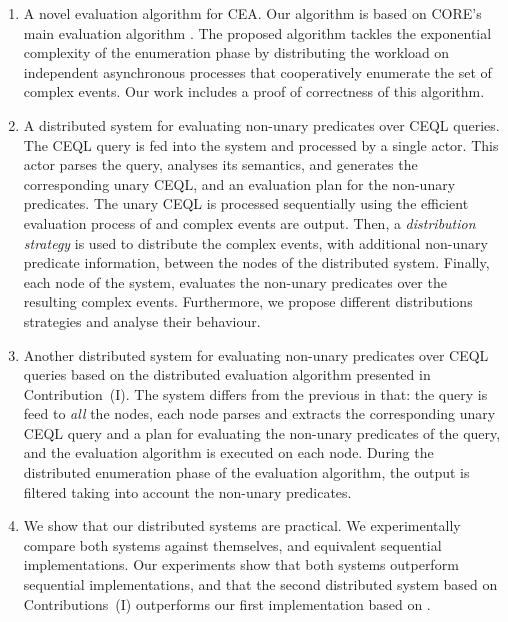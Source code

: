\begin{enumerate}[label=(\roman*)]
  \item A novel evaluation algorithm for CEA. Our algorithm is based on CORE's main evaluation algorithm \cite{core}. The proposed algorithm tackles the exponential complexity of the enumeration phase by distributing the workload on independent asynchronous processes that cooperatively enumerate the set of complex events. Our work includes a proof of correctness of this algorithm.

  \item A distributed system for evaluating non-unary predicates over CEQL queries. The CEQL query is fed into the system and processed by a single actor. This actor parses the query, analyses its semantics, and generates the corresponding unary CEQL, and an evaluation plan for the non-unary predicates. The unary CEQL is processed sequentially using the efficient evaluation process of \cite{formal-framework-cep} and complex events are output. Then, a \emph{distribution strategy} is used to distribute the complex events, with additional non-unary predicate information, between the nodes of the distributed system. Finally, each node of the system, evaluates the non-unary predicates over the resulting complex events.   Furthermore, we propose different distributions strategies and analyse their behaviour.

  \item Another distributed system for evaluating non-unary predicates over CEQL queries based on the distributed evaluation algorithm presented in Contribution~(I). The system differs from the previous in that: the query is feed to \emph{all} the nodes, each node parses and extracts the corresponding unary CEQL query and a plan for evaluating the non-unary predicates of the query, and the evaluation algorithm is executed on each node. During the distributed enumeration phase of the evaluation algorithm, the output is filtered taking into account the non-unary predicates.

  \item We show that our distributed systems are practical. We experimentally compare both systems against themselves, and equivalent sequential implementations. Our experiments show that both systems outperform sequential implementations, and that the second distributed system based on Contributions~(I) outperforms our first implementation based on \cite{formal-framework-cep}.
\end{enumerate}


